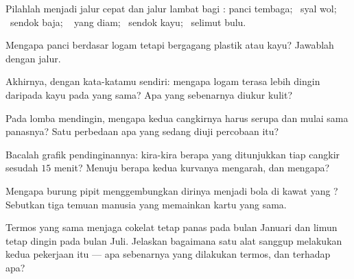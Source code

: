 \begin{exercise}[$\star$]\label{exo:g5:heat-and-insulation:3}
Pilahlah menjadi jalur cepat dan jalur lambat bagi : panci
tembaga; \ syal wol; \ sendok baja; \  yang diam; \ sendok kayu;
\ selimut bulu.
\end{exercise}

\begin{exercise}[$\star$]\label{exo:g5:heat-and-insulation:4}
Mengapa panci berdasar logam tetapi bergagang plastik atau kayu?
Jawablah dengan jalur.
\end{exercise}

\begin{exercise}[$\star$]\label{exo:g5:heat-and-insulation:5}
Akhirnya, dengan kata-katamu sendiri: mengapa logam terasa lebih
dingin daripada kayu pada  yang sama? Apa yang sebenarnya diukur
kulit?
\end{exercise}

\begin{exercise}[$\star$]\label{exo:g5:heat-and-insulation:6}
Pada lomba mendingin, mengapa kedua cangkirnya harus serupa dan mulai
sama panasnya? Satu perbedaan apa yang sedang diuji percobaan itu?
\end{exercise}

\begin{exercise}[$\star$]\label{exo:g5:heat-and-insulation:7}
Bacalah grafik pendinginannya: kira-kira berapa  yang ditunjukkan
tiap cangkir sesudah $15$ menit? Menuju  berapa kedua kurvanya
mengarah, dan mengapa?
\end{exercise}

\begin{exercise}[$\star$]\label{exo:g5:heat-and-insulation:8}
Mengapa burung pipit menggembungkan dirinya menjadi bola di kawat yang
? Sebutkan tiga temuan manusia yang memainkan kartu yang sama.
\end{exercise}

\begin{exercise}[$\star\star$]\label{exo:g5:heat-and-insulation:9}
Termos yang sama menjaga cokelat tetap panas pada bulan Januari dan
limun tetap dingin pada bulan Juli. Jelaskan bagaimana satu alat
sanggup melakukan kedua pekerjaan itu --- apa sebenarnya yang
dilakukan termos, dan terhadap apa?
\end{exercise}

